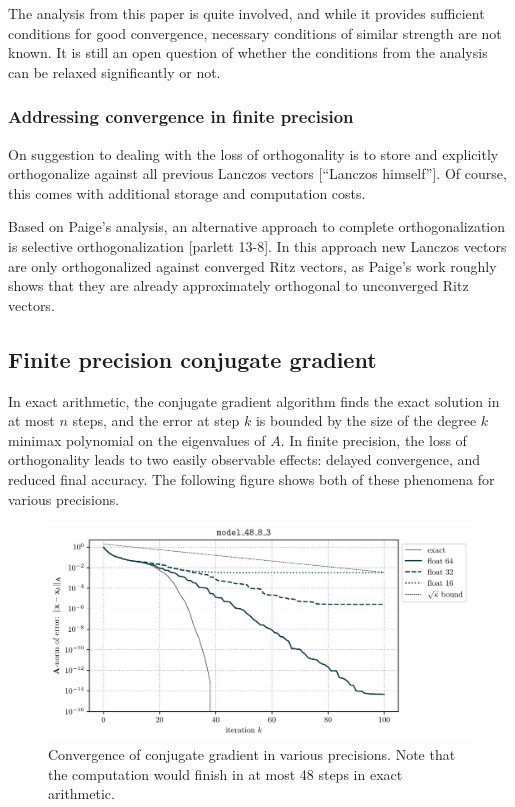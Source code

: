 \documentclass[10pt]{article}
\makeatletter
\def\maxwidth{\ifdim\Gin@nat@width>\linewidth\linewidth
\else\Gin@nat@width\fi}
\let\Oldincludegraphics\includegraphics
\renewcommand{\includegraphics}[1]{\Oldincludegraphics[width=\maxwidth]{#1}}
\makeatother
\begin{document}
The analysis from this paper is quite involved, and while it provides sufficient conditions for good convergence, necessary conditions of similar strength are not known.
It is still an open question of whether the conditions from the analysis can be relaxed significantly or not.

\subsubsection{Addressing convergence in finite precision}

On suggestion to dealing with the loss of orthogonality is to store and explicitly orthogonalize against all previous Lanczos vectors {[}``Lanczos himself''{]}.
Of course, this comes with additional storage and computation costs.

Based on Paige's analysis, an alternative approach to complete orthogonalization is selective orthogonalization {[}parlett 13-8{]}.
In this approach new Lanczos vectors are only orthogonalized against converged Ritz vectors, as Paige's work roughly shows that they are already approximately orthogonal to unconverged Ritz vectors.

\subsection{Finite precision conjugate gradient}

In exact arithmetic, the conjugate gradient algorithm finds the exact solution in at most \(n\) steps, and the error at step \(k\) is bounded by the size of the degree \(k\) minimax polynomial on the eigenvalues of \(A\).
In finite precision, the loss of orthogonality leads to two easily observable effects: delayed convergence, and reduced final accuracy.
The following figure shows both of these phenomena for various precisions.

\begin{figure}
\centering
\includegraphics{./imgs/multiple_precision.pdf}
\caption{Convergence of conjugate gradient in various precisions. Note that the computation would finish in at most 48 steps in exact arithmetic.}
\end{figure}
\end{document}
